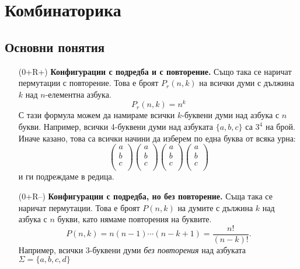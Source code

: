 \chapter{Комбинаторика}

\section{Основни понятия}

\begin{enumerate}
\item[(0+R+)]
  {\bf Конфигурации с подредба и с повторение.}
  Също така се наричат пермутации с повторение.
  Това е броят $P_r(n,k)$ на всички думи с дължина $k$ над $n$-елементна азбука.
  \[P_r(n,k) = n^k\]
  С тази формула можем да намираме всички $k$-буквени думи над азбука с $n$ букви.
  Например, всички 4-буквени думи над азбуката $\{a,b,c\}$ са $3^4$ на брой.
  Иначе казано, това са всички начини да изберем по една буква от всяка урна:
  \[
  \left(\begin{array}{c}
      a\\
      b\\
      c\\
      \end{array}
    \right)
  \left(\begin{array}{c}
      a\\
      b\\
      c\\
      \end{array}
    \right)
  \left(\begin{array}{c}
      a\\
      b\\
      c\\
      \end{array}
    \right)
  \left(\begin{array}{c}
      a\\
      b\\
      c\\
      \end{array}
    \right)
  \]
  и ги подреждаме в редица.
\item[(0+R--)]
  {\bf Конфигурации с подредба, но без повторение.}
  Съща така се наричат пермутации.
  Това е броят $P(n,k)$ на думите с дължина $k$ над азбука с $n$ букви, като нямаме повторения на буквите.
  \[P(n,k) = n(n-1)\cdots(n-k+1) = \frac{n!}{(n-k)!}.\]
  Например, всички 3-буквени думи {\em без повторения} над азбуката $\Sigma = \{a,b,c,d\}$

\end{enumerate}
